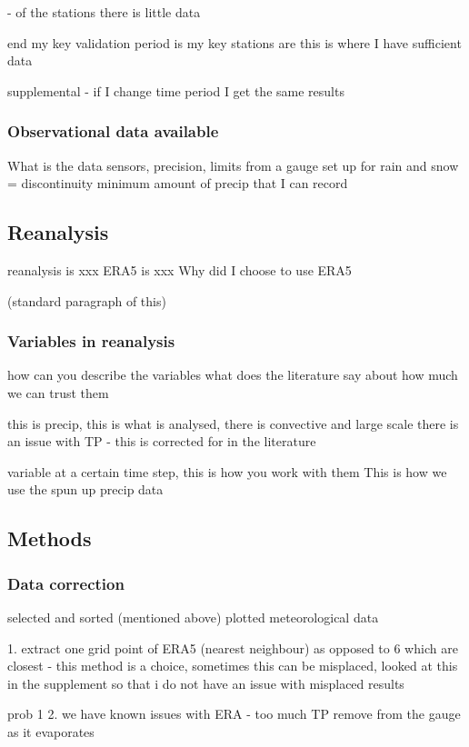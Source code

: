 \documentclass[draft]{agujournal2019}
\begin{document}
- of the stations there is little data

end 
my key validation period is 
my key stations are 
this is where I have sufficient data

\cite{Mahrt1987}
supplemental - if I change time period I get the same results

\subsubsection{Observational data available}
What is the data
sensors, precision, limits from a gauge 
set up for rain and snow = discontinuity
minimum amount of precip that I can record

\subsection{Reanalysis}
reanalysis is xxx
ERA5 is xxx
Why did I choose to use ERA5

(standard paragraph of this)

\subsubsection{Variables in reanalysis}

how can you describe the variables  
what does the literature say about how much we can trust them 

this is precip, this is what is analysed, there is convective and large scale
there is an issue with TP - this is corrected for in the literature 

variable at a certain time step, this is how you work with them
This is how we use the spun up precip data 

\subsection{Methods}
\subsubsection{Data correction}
selected and sorted (mentioned above) plotted meteorological data 

1. extract one grid point of ERA5 (nearest neighbour) as opposed to 6 which are closest
- this method is a choice, sometimes this can be misplaced, looked at this in the supplement so that i do not have an issue with misplaced results

prob 1 2. we have known issues with ERA - too much TP 
remove from the gauge as it evaporates
\end{document}
